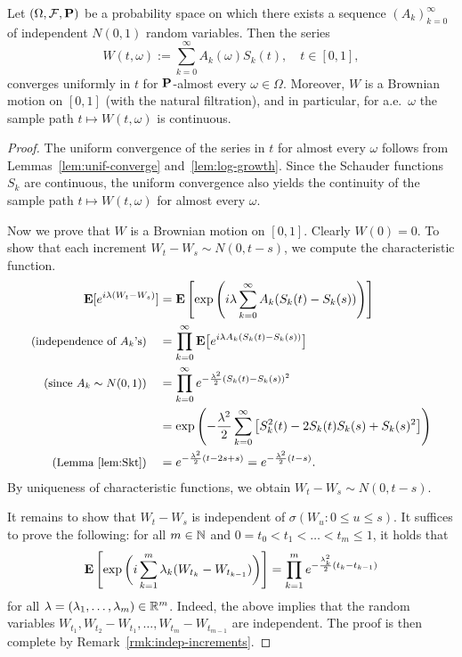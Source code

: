 \begin{theorem}
    Let $(\Omega,\mathcal{F},\mathbf{P})$ be a probability space on which there exists a sequence $(A_k)_{k=0}^\infty$ of independent $N(0,1)$ random variables. Then the series
    \begin{equation*}
        W(t,\omega) := \sum_{k=0}^\infty A_k(\omega)S_k(t), \quad t\in [0,1],
    \end{equation*}
    converges uniformly in $t$ for $\mathbf{P}$-almost every $\omega\in\Omega$. Moreover, $W$ is a Brownian motion on $[0,1]$ (with the natural filtration), and in particular, for a.e.\ $\omega$ the sample path $t\mapsto W(t,\omega)$ is continuous.
\end{theorem}

\begin{proof}
    The uniform convergence of the series in $t$ for almost every $\omega$ follows from Lemmas~\ref{lem:unif-converge} and~\ref{lem:log-growth}. Since the Schauder functions $S_k$ are continuous, the uniform convergence also yields the continuity of the sample path $t\mapsto W(t,\omega)$ for almost every $\omega$.

    Now we prove that $W$ is a Brownian motion on $[0,1]$. Clearly $W(0)=0$. To show that each increment $W_t-W_s \sim N(0,t-s)$, we compute the characteristic function.
    \begin{align*}
        \mathbf{E}[e^{i\lambda(W_t-W_s)}] &= \mathbf{E}\left[\exp\left(i\lambda\sum_{k=0}^\infty A_k(S_k(t)-S_k(s))\right)\right] \\
        \text{\small(independence of $A_k$'s)}\quad &= \prod_{k=0}^\infty \mathbf{E}\big[e^{i\lambda A_k(S_k(t)-S_k(s))}\big] \\
        \text{\small(since $A_k\sim N(0,1)$)}\quad &= \prod_{k=0}^\infty e^{-\frac{\lambda^2}{2}(S_k(t)-S_k(s))^2} \\
        &= \exp\left(-\frac{\lambda^2}{2}\sum_{k=0}^\infty \big[S_k^2(t)-2S_k(t)S_k(s)+S_k(s)^2\big]\right) \\
        \text{\small(Lemma~\ref{lem:Skt})}\quad &= e^{-\frac{\lambda^2}{2}(t-2s+s)} = e^{-\frac{\lambda^2}{2}(t-s)}.
    \end{align*}
    By uniqueness of characteristic functions, we obtain $W_t-W_s\sim N(0,t-s)$.

    It remains to show that $W_t-W_s$ is independent of $\sigma(W_u:0\le u\le s)$. It suffices to prove the following: for all $m\in\mathbb{N}$ and $0=t_0<t_1<\ldots <t_m\le 1$, it holds that
    \begin{equation}
    \label{eq:proof-indep-increments}
        \mathbf{E}\left[\exp\bigg(i\sum_{k=1}^m \lambda_k (W_{t_k}-W_{t_{k-1}})\bigg)\right] = \prod_{k=1}^m e^{-\frac{\lambda^2_k}{2}(t_k-t_{k-1})}
    \end{equation}
    for all $\lambda=(\lambda_1,\ldots,\lambda_m)\in\mathbb{R}^m$. Indeed, the above implies that the random variables $W_{t_1}, W_{t_2}-W_{t_1}, \ldots, W_{t_m}-W_{t_{m-1}}$ are independent. The proof is then complete by Remark~\ref{rmk:indep-increments}.


\end{proof}
